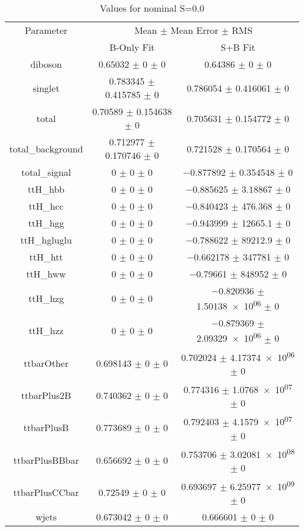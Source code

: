 \begin{table}
\centering
\caption{Values for nominal S=0.0}
\begin{tabular}{ccc}
\toprule
Parameter & \multicolumn{2}{c}{Mean $\pm$ Mean Error $\pm$ RMS}\\
 & B-Only Fit & S+B Fit\\
\midrule
diboson & \num{0.65032} $\pm$ \num{0} $\pm$ \num{0} & \num{0.64386} $\pm$ \num{0} $\pm$ \num{0}\\
singlet & \num{0.783345} $\pm$ \num{0.415785} $\pm$ \num{0} & \num{0.786054} $\pm$ \num{0.416061} $\pm$ \num{0}\\
total & \num{0.70589} $\pm$ \num{0.154638} $\pm$ \num{0} & \num{0.705631} $\pm$ \num{0.154772} $\pm$ \num{0}\\
total\_background & \num{0.712977} $\pm$ \num{0.170746} $\pm$ \num{0} & \num{0.721528} $\pm$ \num{0.170564} $\pm$ \num{0}\\
total\_signal & \num{0} $\pm$ \num{0} $\pm$ \num{0} & \num{-0.877892} $\pm$ \num{0.354548} $\pm$ \num{0}\\
ttH\_hbb & \num{0} $\pm$ \num{0} $\pm$ \num{0} & \num{-0.885625} $\pm$ \num{3.18867} $\pm$ \num{0}\\
ttH\_hcc & \num{0} $\pm$ \num{0} $\pm$ \num{0} & \num{-0.840423} $\pm$ \num{476.368} $\pm$ \num{0}\\
ttH\_hgg & \num{0} $\pm$ \num{0} $\pm$ \num{0} & \num{-0.943999} $\pm$ \num{12665.1} $\pm$ \num{0}\\
ttH\_hgluglu & \num{0} $\pm$ \num{0} $\pm$ \num{0} & \num{-0.788622} $\pm$ \num{89212.9} $\pm$ \num{0}\\
ttH\_htt & \num{0} $\pm$ \num{0} $\pm$ \num{0} & \num{-0.662178} $\pm$ \num{347781} $\pm$ \num{0}\\
ttH\_hww & \num{0} $\pm$ \num{0} $\pm$ \num{0} & \num{-0.79661} $\pm$ \num{848952} $\pm$ \num{0}\\
ttH\_hzg & \num{0} $\pm$ \num{0} $\pm$ \num{0} & \num{-0.820936} $\pm$ \num{1.50138e+06} $\pm$ \num{0}\\
ttH\_hzz & \num{0} $\pm$ \num{0} $\pm$ \num{0} & \num{-0.879369} $\pm$ \num{2.09329e+06} $\pm$ \num{0}\\
ttbarOther & \num{0.698143} $\pm$ \num{0} $\pm$ \num{0} & \num{0.702024} $\pm$ \num{4.17374e+06} $\pm$ \num{0}\\
ttbarPlus2B & \num{0.740362} $\pm$ \num{0} $\pm$ \num{0} & \num{0.774316} $\pm$ \num{1.0768e+07} $\pm$ \num{0}\\
ttbarPlusB & \num{0.773689} $\pm$ \num{0} $\pm$ \num{0} & \num{0.792403} $\pm$ \num{4.1579e+07} $\pm$ \num{0}\\
ttbarPlusBBbar & \num{0.656692} $\pm$ \num{0} $\pm$ \num{0} & \num{0.753706} $\pm$ \num{3.02081e+08} $\pm$ \num{0}\\
ttbarPlusCCbar & \num{0.72549} $\pm$ \num{0} $\pm$ \num{0} & \num{0.693697} $\pm$ \num{6.25977e+09} $\pm$ \num{0}\\
wjets & \num{0.673042} $\pm$ \num{0} $\pm$ \num{0} & \num{0.666601} $\pm$ \num{0} $\pm$ \num{0}\\
\bottomrule
\end{tabular}
\end{table}